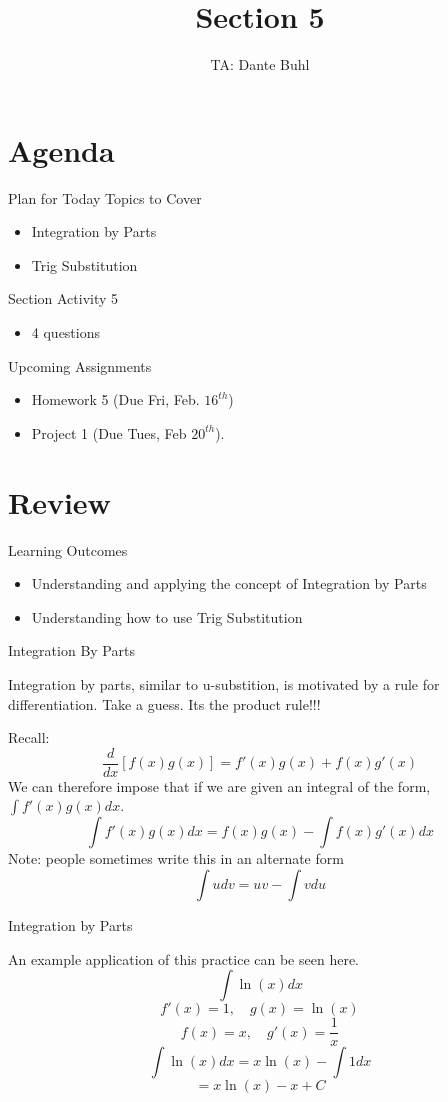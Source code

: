 \documentclass{beamer}
\title{Section 5}
\author{TA: Dante Buhl}
\institute{UCSC Math-19B}
\begin{document}
\newcommand{\bmp}[1]{\begin{minipage}{#1\textwidth}}
\newcommand{\emp}{\end{minipage}}


\frame{\titlepage}

\section{Agenda}
\begin{frame}{Plan for Today}
    Topics to Cover
    \begin{itemize}
        \item Integration by Parts
        \item Trig Substitution
    \end{itemize}
    Section Activity 5
    \begin{itemize}
        \item 4 questions
    \end{itemize}
    Upcoming Assignments
    \begin{itemize}
        \item Homework 5 (Due Fri, Feb. $16^{th}$)
        \item Project 1 (Due Tues, Feb $20^{th}$).
    \end{itemize}
\end{frame}


\section{Review}
\begin{frame}{Learning Outcomes}
    \begin{itemize}
        \item Understanding and applying the concept of Integration by Parts
        \item Understanding how to use Trig Substitution
    \end{itemize}
\end{frame}

\begin{frame}{Integration By Parts}

Integration by parts, similar to u-substition, is motivated by a rule for differentiation. Take a guess. Its the product rule!!!

Recall: 
\[
    \frac{d}{dx} \left[f(x)g(x)\right] = f'(x)g(x) + f(x)g'(x)
\]
We can therefore impose that if we are given an integral of the form, $\int f'(x)g(x)dx$.
\[
    \int f'(x)g(x)dx = f(x)g(x) - \int f(x)g'(x)dx
\]
\footnotesize{Note: people sometimes write this in an alternate form}
\normalsize
\[
    \int u dv = u v - \int v du
\]

\end{frame}
\begin{frame}{Integration by Parts}

An example application of this practice can be seen here. 
    \[
        \int \ln(x)dx
    \]
    \[
        f'(x) = 1, \quad g(x) = \ln(x)
    \]
    \[
        f(x) = x, \quad g'(x) = \frac{1}{x}
    \]
    \[
        \int \ln(x)dx = x\ln(x) - \int 1dx 
    \]
    \[
        = x\ln(x) - x + C
    \]
\end{frame}
\end{document}
